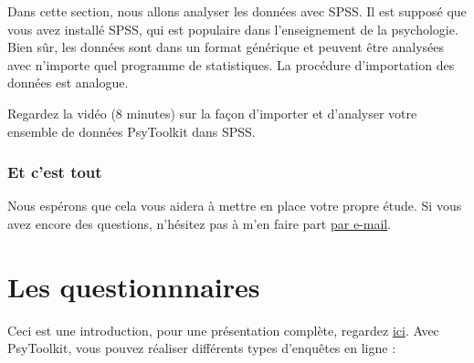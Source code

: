 \documentclass[
]{book}
\begin{document}
Dans cette section, nous allons analyser les données avec SPSS. Il est
supposé que vous avez installé SPSS, qui est populaire dans
l'enseignement de la psychologie. Bien sûr, les données sont dans un
format générique et peuvent être analysées avec n'importe quel programme
de statistiques. La procédure d'importation des données est analogue.

Regardez la vidéo (8 minutes) sur la façon d'importer et d'analyser
votre ensemble de données PsyToolkit dans SPSS.

\hypertarget{et-cest-tout}{%
\subsection{Et c'est tout}\label{et-cest-tout}}

Nous espérons que cela vous aidera à mettre en place votre propre étude.
Si vous avez encore des questions, n'hésitez pas à m'en faire part
\href{mailto:psytoolkit@gmx.com}{par e-mail}.

\hypertarget{s7}{%
\chapter{Les questionnnaires}\label{s7}}

Ceci est une introduction, pour une présentation complète, regardez
\protect\hyperlink{s8}{ici}. Avec PsyToolkit, vous pouvez réaliser
différents types d'enquêtes en ligne :
\end{document}
